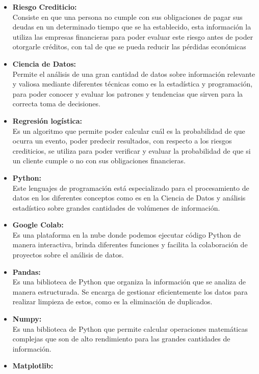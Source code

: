 \documentclass[12pt,a4paper]{article}
\begin{document}
\begin{itemize}[label=-]
    \item \textbf{Riesgo Crediticio:}\\
          Consiste en que una persona no cumple con sus obligaciones de pagar sus deudas en un determinado tiempo que se ha establecido, esta información la utiliza las empresas financieras para poder evaluar este riesgo antes de poder otorgarle créditos, con tal de que se pueda reducir las pérdidas económicas
    \item \textbf{Ciencia de Datos:}\\
          Permite el análisis de una gran cantidad de datos sobre información relevante y valiosa mediante diferentes técnicas como es la estadística y programación, para poder conocer y evaluar los patrones y tendencias que sirven para la correcta toma de decisiones.
    \item \textbf{Regresión logística:}\\
          Es un algoritmo que permite poder calcular cuál es la probabilidad de que ocurra un evento, poder predecir resultados, con respecto a los riesgos crediticios, se utiliza para poder verificar y evaluar la probabilidad de que si un cliente cumple o no con sus obligaciones financieras.
    \item \textbf{Python:}\\
          Este lenguajes de programación está especializado para el procesamiento de datos en los diferentes conceptos como es en la Ciencia de Datos y análisis estadístico sobre grandes cantidades de volúmenes de información.
    \item \textbf{Google Colab:}\\
          Es una plataforma en la nube donde podemos ejecutar código Python de manera interactiva, brinda diferentes funciones y facilita la colaboración de proyectos sobre el análisis de datos.
    \item \textbf{Pandas:}\\
          Es una biblioteca de Python que organiza la información que se analiza de manera estructurada. Se encarga de gestionar eficientemente los datos para realizar limpieza de estos, como es la eliminación de duplicados.
    \item \textbf{Numpy:}\\
          Es una biblioteca de Python que permite calcular operaciones matemáticas complejas que son de alto rendimiento para las grandes cantidades de información.
    \item \textbf{Matplotlib:}\\

\end{itemize}
\end{document}
